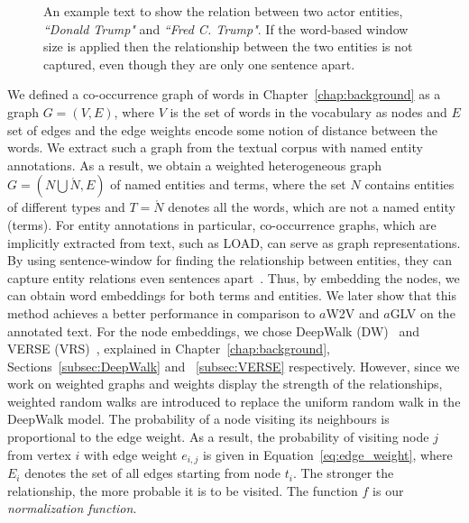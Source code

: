 \begin{figure}
\centering 
\resizebox{0.90\textwidth}{0.2\textwidth}{      

}
\caption{An example text to show the relation between two actor entities, \emph{``Donald Trump"} and \emph{``Fred C. Trump"}. If the word-based window size is applied then the relationship between the two entities is not captured, even though they are only one sentence apart.}
\label{fig:article_entities}
\end{figure}
\noindent
We defined a co-occurrence graph of words in Chapter~\ref{chap:background} as a graph $G=(V,E)$, where $V$ is the set of words in the vocabulary as nodes and $E$ set of edges and the edge weights encode some notion of distance between the words.
We extract such a graph from the textual corpus with named entity annotations. As a result, we obtain a weighted heterogeneous graph $G=(N\bigcup  \acute {N},E)$ of named entities and terms, where the set $N$ contains entities of different types and $ T=\acute {N }$ denotes all the words, which are not a named entity (terms).
For entity annotations in particular, co-occurrence graphs, which are implicitly extracted from text, such as LOAD, can serve as graph representations. By using  sentence-window for finding the relationship between entities, they can capture entity relations even sentences apart~. Thus, by embedding the nodes, we can obtain word embeddings for both terms and entities. We later show that this method achieves a better performance in comparison to $a$W2V and $a$GLV on the annotated text. For the node embeddings, we chose DeepWalk (DW)~ and VERSE (VRS)~, explained in Chapter~\ref{chap:background}, Sections~\ref{subsec:DeepWalk} and ~\ref{subsec:VERSE} respectively.
However, since we work on weighted graphs and weights display the strength of the relationships, weighted random walks are introduced to replace the uniform random walk in the DeepWalk model.
The probability of a node visiting its neighbours is proportional to the edge weight. As a result, the probability of visiting node $j$ from vertex $i$ with edge weight $e_{i,j}$ is given in Equation~\ref{eq:edge_weight}, where $ E_{ i }$ denotes the set of all edges starting from node $t_{i}$. The stronger the relationship, the more probable it is to be visited.
The function $f$ is our \emph{normalization function}. 

